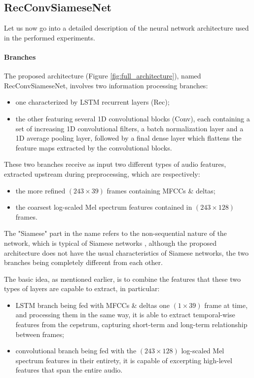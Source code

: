 \subsection{RecConvSiameseNet}\label{subsec:recconvsnet}
Let us now go into a detailed description of the neural network architecture used in the performed experiments.

\paragraph{Branches}
The proposed architecture (Figure \vref{fig:full_architecture}), named RecConvSiameseNet, involves two information processing branches:
\begin{itemize}
	\item one characterized by LSTM recurrent layers (Rec);
	\item the other featuring several 1D convolutional blocks (Conv), each containing a set of increasing 1D convolutional filters, a batch normalization layer and a 1D average pooling layer, followed by a final dense layer which flattens the feature maps extracted by the convolutional blocks.
\end{itemize}
These two branches receive as input two different types of audio features, extracted upstream during preprocessing, which are respectively:
\begin{itemize}
	\item the more refined $(243 \times 39)$ frames containing MFCCs \& deltas;
	\item the coarsest log-scaled Mel spectrum features contained in $(243 \times 128)$ frames.
\end{itemize}

The "Siamese" part in the name refers to the non-sequential nature of the network, which is typical of Siamese networks \cite{siamesenn}, although the proposed architecture does not have the usual characteristics of Siamese networks, the two branches being completely different from each other.

The basic idea, as mentioned earlier, is to combine the features that these two types of layers are capable to extract, in particular:

\begin{itemize}
	\item LSTM branch being fed with MFCCs \& deltas one $(1 \times 39)$ frame at time, and processing them in the same way, it is able to extract temporal-wise features from the cepstrum, capturing short-term and long-term relationship between frames;
	
	\item convolutional branch being fed with the $(243 \times 128)$ log-scaled Mel spectrum features in their entirety, it is capable of excerpting high-level features that span the entire audio.
\end{itemize}

